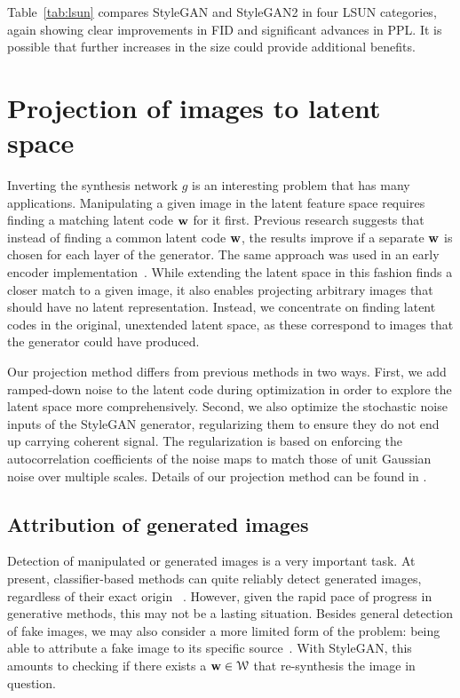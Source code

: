 \documentclass[10pt,twocolumn,letterpaper]{article}
\newcommand{\FINAL}[2][]{#2} %
\newcommand{\ww}{{\bf w}}
\newcommand{\WW}{\mathcal{W}}
\begin{document}
\tablsun            %

Table~\ref{tab:lsun} compares StyleGAN and StyleGAN2 in four LSUN categories, again showing clear improvements in FID and significant advances in PPL.
It is possible that further increases in the size could provide additional benefits.%

\section{Projection of images to latent space}
\label{sec:proj}

Inverting the synthesis network $g$ is an interesting problem that has many applications. 
Manipulating a given image in the latent feature space requires finding a matching latent code $\ww$ for it first.
Previous research \cite{Abdal2019,Gabbay2019} suggests that instead of finding a common latent code $\ww$, the results improve if a separate $\ww$ is chosen for each layer of the generator.
The same approach was used in an early encoder implementation~\cite{puzer}. 
While extending the latent space in this fashion finds a closer match to a given image, it also enables projecting arbitrary images that should have no latent representation.
Instead, we concentrate on finding latent codes in the original, unextended latent space, as these correspond to images that the generator could have produced.

\figprojimgcarhorizontal  %
\figprojhist %

Our projection method differs from previous methods in two ways. First, we add ramped-down noise to the latent code during optimization in order to explore the latent space more comprehensively.
Second, we also optimize the stochastic noise inputs of the StyleGAN generator, regularizing them to ensure they do not end up carrying coherent signal.
The regularization is based on enforcing the autocorrelation coefficients of the noise maps to match those of unit Gaussian noise over multiple scales.
Details of our projection method can be found in .

\subsection{Attribution of generated images}

\FINAL{
Detection of manipulated or generated images is a very important task. 
At present, classifier-based methods can quite reliably detect generated images, regardless of their exact origin ~\cite{Li2018,Yu2018,Wang2019,Zhang2019ganartifacts,Wang2019b}.
However, given the rapid pace of progress in generative methods, this may not be a lasting situation.
Besides general detection of fake images, we may also consider a more limited form of the problem: being able to attribute a fake image to its specific source~\cite{Albright2019}. With StyleGAN, this amounts to checking if there exists a $\ww \in \WW$ that re-synthesis the image in question.}
\end{document}
